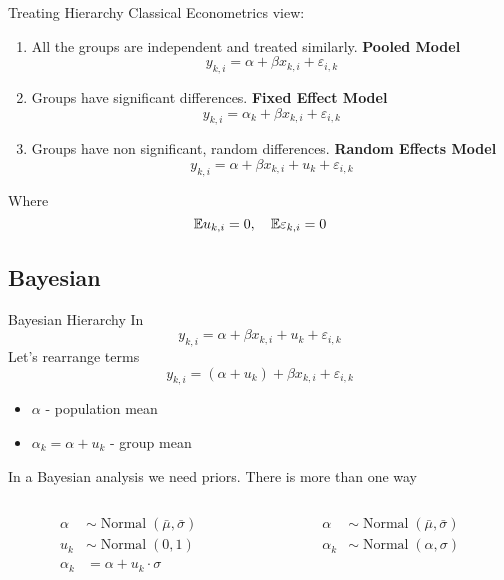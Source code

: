 \documentclass{beamer}
\begin{document}
\begin{frame}{Treating Hierarchy}
Classical Econometrics view:
\begin{enumerate}
        \item All the groups are independent and treated similarly. \textbf{Pooled Model}
    \begin{equation*}
        y_{k,i} = \alpha + \beta x_{k,i} + \varepsilon_{i,k}
    \end{equation*}
        \item Groups have significant differences. \textbf{Fixed Effect Model}
    \begin{equation*}
        y_{k,i} = \alpha_{k} + \beta x_{k,i} + \varepsilon_{i,k}
    \end{equation*}
        \item Groups have non significant, random differences. \textbf{Random Effects Model}
    \begin{equation*}
        y_{k,i} = \alpha + \beta x_{k,i} + u_{k} + \varepsilon_{i,k}
    \end{equation*}
\end{enumerate}
Where
\begin{equation*}
    \mathbb{E} u_{k,i} = 0,\quad \mathbb{E} \varepsilon_{k,i} = 0
\end{equation*}
\end{frame}
\subsection{Bayesian}
\begin{frame}{Bayesian Hierarchy}
In
\begin{equation*}
    y_{k,i} = \alpha + \beta x_{k,i} + u_{k} + \varepsilon_{i,k}
\end{equation*}
Let's rearrange terms
\begin{equation*}
    y_{k,i} = (\alpha + u_{k}) + \beta x_{k,i} + \varepsilon_{i,k}
\end{equation*}
\begin{itemize}
    \item $\alpha$ - population mean
    \item $\alpha_k = \alpha + u_k$ - group mean
\end{itemize}
In a Bayesian analysis we need priors. There is more than one way
\begin{columns}
\begin{column}{0.5\linewidth}
\begin{align*}
    \alpha &\sim \operatorname{Normal}(\bar\mu, \bar\sigma)\\
    u_k &\sim \operatorname{Normal}(0, 1)\\
    \alpha_k & = \alpha + u_k \cdot \sigma
\end{align*}
\end{column}
\begin{column}{0.5\linewidth}
\begin{align*}
    \alpha &\sim \operatorname{Normal}(\bar\mu, \bar\sigma)\\
    \alpha_k &\sim \operatorname{Normal}(\alpha, \sigma)
\end{align*}
\end{column}
\end{columns}
\end{frame}
\end{document}
